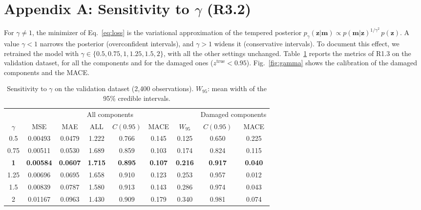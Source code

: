 \documentclass[11pt]{article}
\newcommand{\m}{\mathbf{m}}
\newcommand{\z}{\mathbf{z}}
\begin{document}
\appendix
\section{Appendix A: Sensitivity to $\gamma$ (R3.2)}
\label{app:gamma}
For $\gamma\neq1$, the minimizer of Eq.~\eqref{eq:loss} is the variational approximation of the tempered posterior $p_\gamma(\z|\m)\propto p(\m|\z)^{1/\gamma^2}\,p(\z)$.
A value $\gamma<1$ narrows the posterior (overconfident intervals), and $\gamma>1$ widens it (conservative intervals).
To document this effect, we retrained the model with $\gamma\in\{0.5,0.75,1,1.25,1.5,2\}$, with all the other settings unchanged.
Table~\ref{tab:gamma} reports the metrics of R1.3 on the validation dataset, for all the components and for the damaged ones ($z^{\text{true}}<0.95$).
Fig.~\ref{fig:gamma} shows the calibration of the damaged components and the MACE.

\begin{table}[H]
	\centering\small
	\caption{Sensitivity to $\gamma$ on the validation dataset (2,400 observations). $W_{95}$: mean width of the 95\% credible intervals.}
	\label{tab:gamma}
	\footnotesize
	\setlength{\tabcolsep}{4pt}
	\begin{tabular}{ccccccccc}
		\toprule
		& \multicolumn{6}{c}{All components} & \multicolumn{2}{c}{Damaged components} \\
		\cmidrule(lr){2-7}\cmidrule(lr){8-9}
		$\gamma$ & MSE & MAE & ALL & $C(0.95)$ & MACE & $W_{95}$ & $C(0.95)$ & MACE \\
		\midrule
		0.5 & 0.00493 & 0.0479 & 1.222 & 0.766 & 0.145 & 0.125 & 0.650 & 0.225 \\
		0.75 & 0.00511 & 0.0530 & 1.689 & 0.859 & 0.103 & 0.174 & 0.824 & 0.115 \\
		\textbf{1} & \textbf{0.00584} & \textbf{0.0607} & \textbf{1.715} & \textbf{0.895} & \textbf{0.107} & \textbf{0.216} & \textbf{0.917} & \textbf{0.040} \\
		1.25 & 0.00696 & 0.0695 & 1.658 & 0.910 & 0.123 & 0.253 & 0.957 & 0.012 \\
		1.5 & 0.00839 & 0.0787 & 1.580 & 0.913 & 0.143 & 0.286 & 0.974 & 0.043 \\
		2 & 0.01167 & 0.0963 & 1.430 & 0.909 & 0.179 & 0.340 & 0.981 & 0.074 \\
		\bottomrule
	\end{tabular}
\end{table}
\end{document}
